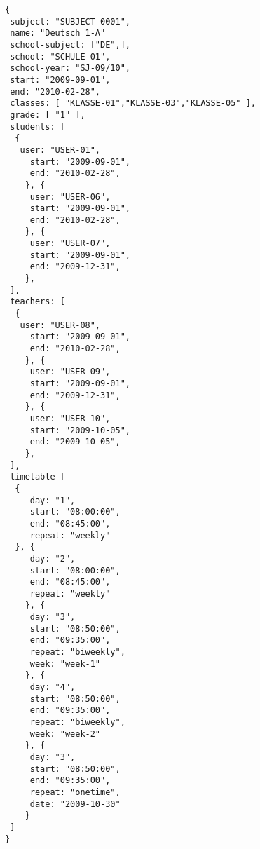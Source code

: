 
\begin{lstlisting}[caption={Beispiel eines Schulfachs},frame=tlrb]
{
 subject: "SUBJECT-0001",
 name: "Deutsch 1-A"
 school-subject: ["DE",],
 school: "SCHULE-01",
 school-year: "SJ-09/10",
 start: "2009-09-01",
 end: "2010-02-28",
 classes: [ "KLASSE-01","KLASSE-03","KLASSE-05" ],
 grade: [ "1" ],
 students: [
  { 
   user: "USER-01",
	 start: "2009-09-01",
	 end: "2010-02-28",
	}, { 
	 user: "USER-06",
	 start: "2009-09-01",
	 end: "2010-02-28",
	}, { 
	 user: "USER-07",
	 start: "2009-09-01",
	 end: "2009-12-31",
	},
 ],
 teachers: [
  { 
   user: "USER-08",
	 start: "2009-09-01",
	 end: "2010-02-28",
	}, { 
	 user: "USER-09",
	 start: "2009-09-01",
	 end: "2009-12-31",
	}, { 
	 user: "USER-10",
	 start: "2009-10-05",
	 end: "2009-10-05",
	},
 ],
 timetable [
  {
	 day: "1",
	 start: "08:00:00",
	 end: "08:45:00",
	 repeat: "weekly"
  }, {
	 day: "2",
	 start: "08:00:00",
	 end: "08:45:00",
	 repeat: "weekly"
	}, {
	 day: "3",
	 start: "08:50:00",
	 end: "09:35:00",
	 repeat: "biweekly",
	 week: "week-1"
	}, {
	 day: "4",
	 start: "08:50:00",
	 end: "09:35:00",
	 repeat: "biweekly",
	 week: "week-2"
	}, {
	 day: "3",
	 start: "08:50:00",
	 end: "09:35:00",
	 repeat: "onetime",
	 date: "2009-10-30"
	}	 
 ]
}
\end{lstlisting}
